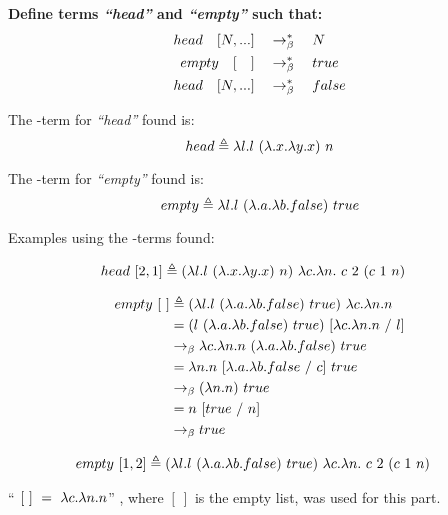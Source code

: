 \documentclass{article}
\begin{document}
	\begin{Large}
		\textbf{Define terms \textit{``head''} and \textit{``empty''} such that:}
			\begin{align*}
				head \quad [ N, ...] &\quad \rightarrow_\beta^*\quad  N\\
				empty \quad [\quad] &\quad \rightarrow_\beta^*\quad true\\
				head \quad [ N, ...] &\quad \rightarrow_\beta^*\quad false
			\end{align*}
		
		The \lamb -term for \textit{``head''} found is:
		\begin{equation*}
			head \triangleq \la l.l \ (\la .x.\la y.x) \ n
		\end{equation*}
		
		The \lamb -term for \textit{``empty''} found is:
		\begin{equation*}
			empty \triangleq \la l.l \ (\la .a.\la b.false) \ true
		\end{equation*}
		
		Examples using the \lamb -terms found:
		
		\begin{align*}
			head \ [2,1] &\triangleq (\la l.l \ (\la .x.\la y.x) \ n) \ \la c.\la n. \ c \ 2 \ (c \ 1 \ n)
		\end{align*}
		
		\begin{align*}
			empty \ [ \ ] &\triangleq (\la l.l \ (\la .a.\la b.false) \ true) \ \la c.\la n.n \\
			&= (l \ (\la .a.\la b.false) \ true) \ [\la c.\la n.n \ / \ l] \\
			&\equals \la c.\la n.n \ (\la .a.\la b.false) \ true \\
			&= \la n.n \ [\la .a.\la b.false \ / \ c] \ true \\
			&\equals (\la n.n) \ true \\
			&= n \ [true \ / \ n] \\
			&\equals true
		\end{align*}
		
		\begin{align*}
			empty \ [1,2] &\triangleq (\lambda l.l \ (\lambda .a.\lambda b.false) \ true) \ \lambda c.\lambda n. \ c \ 2 \ (c \ 1 \ n)
		\end{align*}
		
		``$ \ [ \ ] \ = \ \lambda c.\lambda n.n$'' , where $[ \ ]$ is the empty list, was used for this part.
		
	\end{Large}
	\newpage


	
\end{document}
